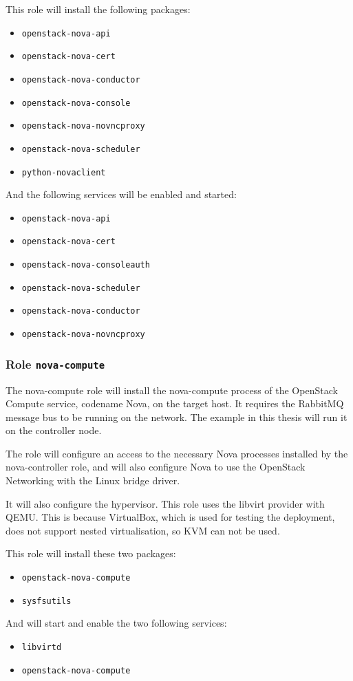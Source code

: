 This role will install the following packages:
\begin{itemize}
  \item{\texttt{openstack-nova-api}}
  \item{\texttt{openstack-nova-cert}}
  \item{\texttt{openstack-nova-conductor}}
  \item{\texttt{openstack-nova-console}}
  \item{\texttt{openstack-nova-novncproxy}}
  \item{\texttt{openstack-nova-scheduler}}
  \item{\texttt{python-novaclient}}
\end{itemize}
And the following services will be enabled and started:
\begin{itemize}
  \item{\texttt{openstack-nova-api}}
  \item{\texttt{openstack-nova-cert}}
  \item{\texttt{openstack-nova-consoleauth}}
  \item{\texttt{openstack-nova-scheduler}}
  \item{\texttt{openstack-nova-conductor}}
  \item{\texttt{openstack-nova-novncproxy}}
\end{itemize}

\subsubsection*{Role \texttt{nova-compute}}
The nova-compute role will install the nova-compute process of the OpenStack Compute service, codename Nova, on the target host. It requires the RabbitMQ message bus to be running on the network. The example in this thesis will run it on the controller node.

The role will configure an access to the necessary Nova processes installed by the nova-controller role, and will also configure Nova to use the OpenStack Networking with the Linux bridge driver.

It will also configure the hypervisor. This role uses the libvirt provider with QEMU. This is because VirtualBox, which is used for testing the deployment, does not support nested virtualisation, so KVM can not be used.

This role will install these two packages:
\begin{itemize}
  \item{\texttt{openstack-nova-compute}}
  \item{\texttt{sysfsutils}}
\end{itemize}
And will start and enable the two following services:
\begin{itemize}
  \item{\texttt{libvirtd}}
  \item{\texttt{openstack-nova-compute}}
\end{itemize}

